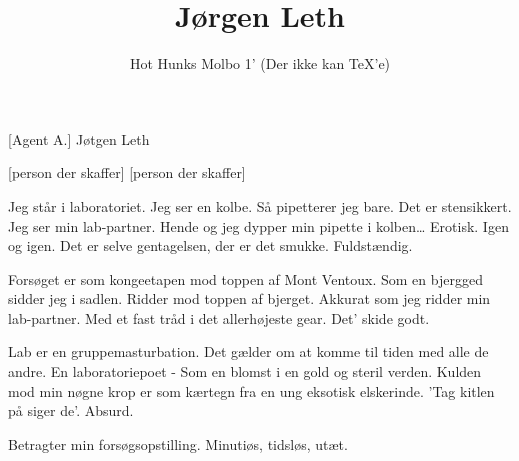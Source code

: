 \documentclass[a4paper,11pt]{article}
\title{Jørgen Leth}
\author{Hot Hunks Molbo 1' (Der ikke kan \TeX'e)}
\begin{document}
\maketitle

\begin{roles}
    [Agent A.] Jøtgen Leth
\end{roles}

\begin{props}
    [person der skaffer]
    [person der skaffer]
\end{props}


\begin{sketch}

 Jeg står i laboratoriet. Jeg ser en kolbe. Så pipetterer jeg bare. Det er stensikkert. Jeg ser min
lab-partner. Hende og jeg dypper min pipette i kolben… Erotisk. Igen og igen. Det er selve
gentagelsen, der er det smukke. Fuldstændig.

 Forsøget er som kongeetapen mod toppen af Mont Ventoux. Som en bjergged sidder jeg i
sadlen. Ridder mod toppen af bjerget. Akkurat som jeg ridder min lab-partner. Med et fast tråd
i det allerhøjeste gear. Det’ skide godt.

Lab er en gruppemasturbation. Det gælder om at komme til tiden med alle de andre. En
laboratoriepoet - Som en blomst i en gold og steril verden. Kulden mod min nøgne krop er som
kærtegn fra en ung eksotisk elskerinde. 'Tag kitlen på siger de'. Absurd.

Betragter min forsøgsopstilling. Minutiøs, tidsløs, utæt.



\end{sketch}
\end{document}
